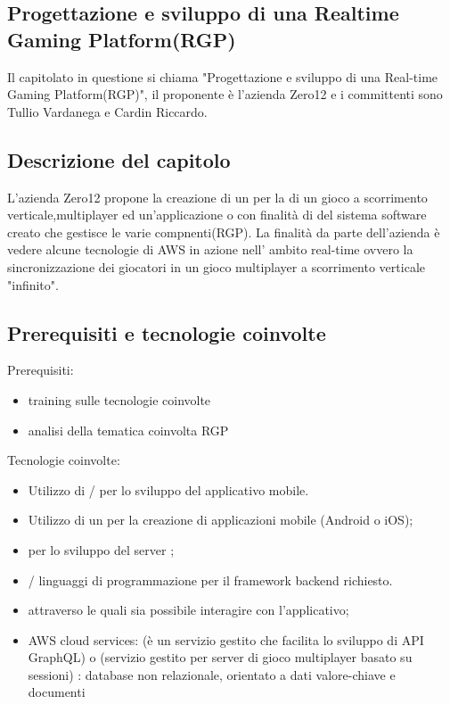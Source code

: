 \subsection{Progettazione e sviluppo di una Realtime Gaming Platform(RGP)}
Il capitolato in questione si chiama "Progettazione e sviluppo di una {Real-time Gaming Platform(RGP)}", il proponente è l'azienda Zero12 e i committenti sono Tullio Vardanega e Cardin Riccardo.

\subsection{Descrizione del capitolo}
L’azienda Zero12 propone la creazione di un  per la  di un gioco a scorrimento verticale,multiplayer ed un'applicazione  o  con finalità di  del sistema software creato che gestisce le varie compnenti(RGP).
La finalità da parte dell’azienda è vedere alcune tecnologie di AWS in azione nell' ambito real-time ovvero la sincronizzazione dei giocatori in un gioco multiplayer a scorrimento verticale "infinito".
\subsection{Prerequisiti e tecnologie coinvolte}
Prerequisiti:
\begin{itemize}
\item training sulle tecnologie coinvolte
\item analisi della tematica coinvolta RGP 
\end{itemize}
Tecnologie coinvolte:
\begin{itemize}
\item Utilizzo di / per lo sviluppo del applicativo mobile.
\item Utilizzo di un  per la creazione di applicazioni mobile (Android o iOS);
\item {} per lo sviluppo del server ;
\item {}/ linguaggi di programmazione per il framework backend richiesto.
\item {}  attraverso le quali sia possibile interagire con l'applicativo;
\item AWS cloud services: 
(è un servizio gestito che facilita lo sviluppo di API GraphQL) o (servizio gestito per server di gioco multiplayer basato su sessioni) 
: database non relazionale, orientato a dati valore-chiave e documenti
\end{itemize}


